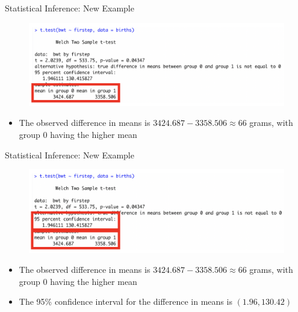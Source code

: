 \documentclass[10pt,t]{beamer}
\begin{document}
\begin{frame}{Statistical Inference: New Example}
\begin{figure}
	\centering \includegraphics[scale=0.5]{ttest2.png}
\end{figure}

\begin{itemize}
	\item The observed difference in means is $3424.687-  3358.506 \approx 66$ grams, with group $0$ having the higher mean
\end{itemize}


\end{frame}

\begin{frame}{Statistical Inference: New Example}
\begin{figure}
	\centering \includegraphics[scale=0.5]{ttest3.png}
\end{figure}

\begin{itemize}
	\item The observed difference in means is $3424.687-  3358.506 \approx 66$ grams, with group $0$ having the higher mean
	\item The 95\% confidence interval for the difference in means is $(1.96, 130.42)$
\end{itemize}

\end{frame}
\end{document}
